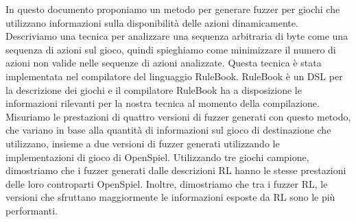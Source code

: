 \documentclass{Configuration_Files/PoliMi3i_thesis}
\begin{document}
In questo documento proponiamo un metodo per generare fuzzer per giochi che utilizzano informazioni sulla disponibilità delle azioni dinamicamente.
Descriviamo una tecnica per analizzare una sequenza arbitraria di byte come una sequenza di azioni sul gioco, quindi spieghiamo come minimizzare il numero di azioni non valide nelle sequenze di azioni analizzate.
Questa tecnica è stata implementata nel compilatore del linguaggio RuleBook. RuleBook è un DSL per la descrizione dei giochi e il compilatore RuleBook ha a disposizione le informazioni rilevanti per la nostra tecnica al momento della compilazione.
Misuriamo le prestazioni di quattro versioni di fuzzer generati con questo metodo, che variano in base alla quantità di informazioni sul gioco di destinazione che utilizzano, insieme a due versioni di fuzzer generati utilizzando le implementazioni di gioco di OpenSpiel.
Utilizzando tre giochi campione, dimostriamo che i fuzzer generati dalle descrizioni RL hanno le stesse prestazioni delle loro controparti OpenSpiel.
Inoltre, dimostriamo che tra i fuzzer RL, le versioni che sfruttano maggiormente le informazioni esposte da RL sono le più performanti.
\\
\\

\thispagestyle{empty}
\tableofcontents %
\thispagestyle{empty}
\cleardoublepage

%
%
%    
%
\end{document}
